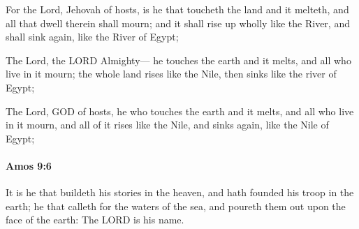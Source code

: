 			\begin{versebox}
					\item[BHS] 
					\item[LXX] 
					\item[ASV] For the Lord, Jehovah of hosts, is he that toucheth the land and it melteth, and all that dwell therein shall mourn; and it shall rise up wholly like the River, and shall sink again, like the River of Egypt;
					\item[NIV] The Lord, the LORD Almighty— he touches the earth and it melts, and all who live in it mourn; the whole land rises like the Nile, then sinks like the river of Egypt;
					\item[NRSV] The Lord, GOD of hosts, he who touches the earth and it melts, and all who live in it mourn, and all of it rises like the Nile, and sinks again, like the Nile of Egypt;
			\end{versebox}

		\paragraph{Amos 9:6} %
			\label{AMOS-9-6}

			It is he that buildeth his stories in the heaven, and hath founded his troop in the earth; he that calleth for the waters of the sea, and poureth them out upon the face of the earth: The LORD is his name.


